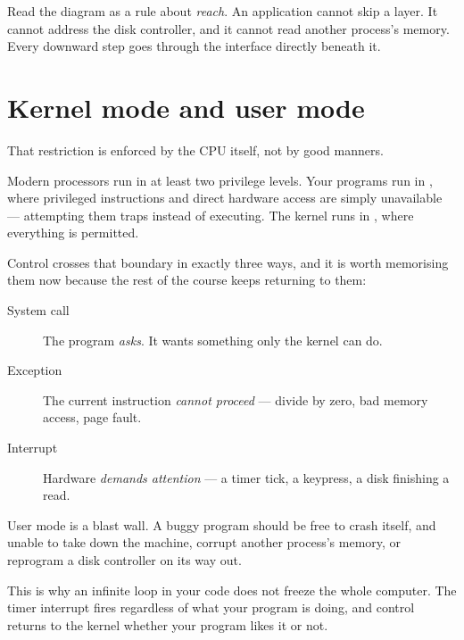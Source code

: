 \begin{mlfigure}
\end{mlfigure}

Read the diagram as a rule about \emph{reach}. An application cannot skip a layer. It cannot address the disk controller, and it cannot read another process's memory. Every downward step goes through the interface directly beneath it.

\section{Kernel mode and user mode}
That restriction is enforced by the CPU itself, not by good manners.

Modern processors run in at least two privilege levels. Your programs run in , where privileged instructions and direct hardware access are simply unavailable --- attempting them traps instead of executing. The kernel runs in , where everything is permitted.

Control crosses that boundary in exactly three ways, and it is worth memorising them now because the rest of the course keeps returning to them:

\begin{description}
  \item[System call] The program \emph{asks}. It wants something only the kernel can do.
  \item[Exception] The current instruction \emph{cannot proceed} --- divide by zero, bad memory access, page fault.
  \item[Interrupt] Hardware \emph{demands attention} --- a timer tick, a keypress, a disk finishing a read.
\end{description}

\begin{intuition}
User mode is a blast wall. A buggy program should be free to crash itself, and unable to take down the machine, corrupt another process's memory, or reprogram a disk controller on its way out.

This is why an infinite loop in your code does not freeze the whole computer. The timer interrupt fires regardless of what your program is doing, and control returns to the kernel whether your program likes it or not.
\end{intuition}

